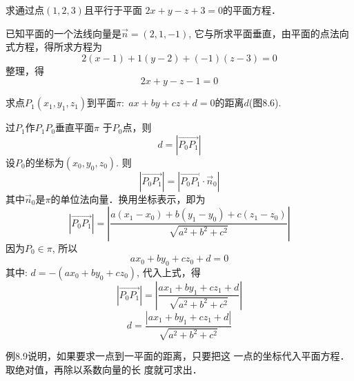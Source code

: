 \begin{example}
    求通过点$(1,2,3)$且平行于平面
$2x+y-z+3=0$的平面方程．
\end{example}

\begin{solution}
    已知平面的一个法线向量是$\vec{n}=(2,1,-1)$, 
它与所求平面垂直，由平面的点法向式方程，得所求方程为
\[2(x-1)+1(y-2)+(-1)(z-3)=0\]
整理，得
\[2x+y-z-1=0\]
\end{solution}

\begin{example}
    求点$P_1(x_1,y_1,z_1)$到平面$\pi:\; ax+by+cz+d=0$的距离$d$(图8.6).
\end{example}

\begin{figure}[htp]
    \centering
{}
    \caption{}
\end{figure}

\begin{solution}
    过$P_1$作$P_1P_0$垂直平面$\pi$
于$P_0$点，则
\[d=|\Vec{P_0P_1}|\]
设$P_0$的坐标为$(x_0,y_0,z_0)$. 则
\[|\Vec{P_0P_1}|=|\Vec{P_0P_1} \cdot \vec{n}_0|\]
其中$\vec{n}_0$是$\pi$的单位法向量．换用坐标表示，即为
\[|\Vec{P_0P_1}|=\left|\frac{a(x_1-x_0)+b(y_1-y_0)+c(z_1-z_0)}{\sqrt{a^2+b^2+c^2}}\right|\]
因为$P_0\in \pi$, 所以
\[ax_0+by_0+cz_0+d=0\]
其中: $d=-(ax_0+by_0+cz_0)$, 代入上式，得
\[|\Vec{P_0P_1}|=\left|\frac{ax_1+by_1+cz_1+d}{\sqrt{a^2+b^2+c^2}}\right|\]
\[d=\frac{|ax_1+by_1+cz_1+d|}{\sqrt{a^2+b^2+c^2}}\]
\end{solution}

例8.9说明，如果要求一点到一平面的距离，只要把这
一点的坐标代入平面方程．取绝对值，再除以系数向量的长
度就可求出．

